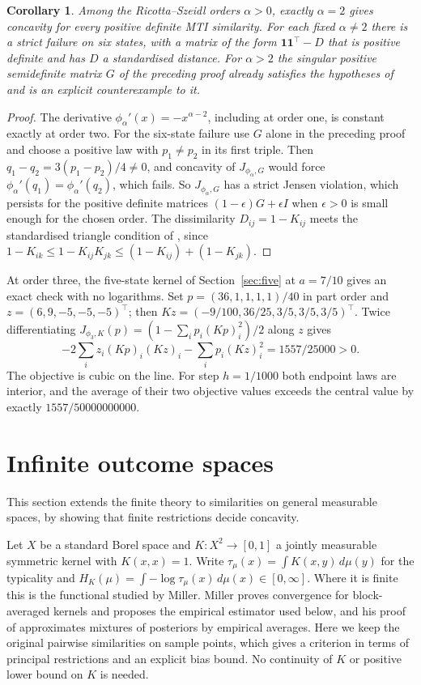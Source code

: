 \documentclass[11pt,a4paper]{article}
\newtheorem{corollary}[theorem]{Corollary}
\theoremstyle{remark}
\newcommand{\one}{\mathbf 1}
\begin{document}
\begin{corollary}\label{cor:ricotta}
Among the Ricotta--Szeidl orders $\alpha>0$, exactly $\alpha=2$ gives concavity for every positive definite MTI similarity. For each fixed $\alpha\ne2$ there is a strict failure on six states, with a matrix of the form $\one\one^\top-D$ that is positive definite and has $D$ a standardised distance. For $\alpha>2$ the singular positive semidefinite matrix $G$ of the preceding proof already satisfies the hypotheses of \cite[Theorem 2]{rs} and is an explicit counterexample to it.
\end{corollary}
\begin{proof}
The derivative $\phi_\alpha'(x)=-x^{\alpha-2}$, including at order one, is constant exactly at order two. For the six-state failure use $G$ alone in the preceding proof and choose a positive law with $p_1\ne p_2$ in its first triple. Then $q_1-q_2=3(p_1-p_2)/4\ne0$, and concavity of $J_{\phi_\alpha,G}$ would force $\phi_\alpha'(q_1)=\phi_\alpha'(q_2)$, which fails. So $J_{\phi_\alpha,G}$ has a strict Jensen violation, which persists for the positive definite matrices $(1-\epsilon)G+\epsilon I$ when $\epsilon>0$ is small enough for the chosen order. The dissimilarity $D_{ij}=1-K_{ij}$ meets the standardised triangle condition of \cite{rs}, since $1-K_{ik}\le1-K_{ij}K_{jk}\le(1-K_{ij})+(1-K_{jk})$.
\end{proof}

At order three, the five-state kernel of Section~\ref{sec:five} at $a=7/10$ gives an exact check with no logarithms. Set $p=(36,1,1,1,1)/40$ in part order and $z=(6,9,-5,-5,-5)^\top$; then $Kz=(-9/100,36/25,3/5,3/5,3/5)^\top$. Twice differentiating $J_{\phi_3,K}(p)=(1-\sum_i p_i(Kp)_i^2)/2$ along $z$ gives
\[
 -2\sum_i z_i(Kp)_i(Kz)_i-\sum_i p_i(Kz)_i^2=1557/25000>0.
\]
The objective is cubic on the line. For step $h=1/1000$ both endpoint laws are interior, and the average of their two objective values exceeds the central value by exactly $1557/50000000000$.

\section{Infinite outcome spaces}\label{sec:measure}
This section extends the finite theory to similarities on general measurable spaces, by showing that finite restrictions decide concavity.

Let $X$ be a standard Borel space and $K:X^2\to[0,1]$ a jointly measurable symmetric kernel with $K(x,x)=1$. Write $\tau_\mu(x)=\int K(x,y)\,d\mu(y)$ for the typicality and $H_K(\mu)=\int -\log\tau_\mu(x)\,d\mu(x)\in[0,\infty]$. Where it is finite this is the functional studied by Miller. Miller \cite[Theorem 5.2 and Section 6.1]{miller} proves convergence for block-averaged kernels and proposes the empirical estimator used below, and his proof of \cite[Lemma A.1]{miller} approximates mixtures of posteriors by empirical averages. Here we keep the original pairwise similarities on sample points, which gives a criterion in terms of principal restrictions and an explicit bias bound. No continuity of $K$ or positive lower bound on $K$ is needed.
\end{document}
